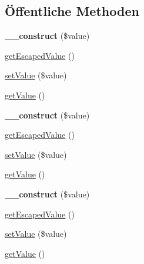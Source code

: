 \subsection*{Öffentliche Methoden}
\begin{DoxyCompactItemize}
\item 
\mbox{\label{class_eluceo_1_1i_cal_1_1_property_1_1_string_value_a1ab822389ddc6e91b84c4edf528134a0}} 
{\bfseries \+\_\+\+\_\+construct} (\$value)
\item 
\mbox{\hyperlink{class_eluceo_1_1i_cal_1_1_property_1_1_string_value_a76f74785d3f3bd3533c40090d2340c01}{get\+Escaped\+Value}} ()
\item 
\mbox{\hyperlink{class_eluceo_1_1i_cal_1_1_property_1_1_string_value_ae8d54aad71b757776262b478a4be042d}{set\+Value}} (\$value)
\item 
\mbox{\hyperlink{class_eluceo_1_1i_cal_1_1_property_1_1_string_value_a0d3ef7c09ebf33769947799a389b5871}{get\+Value}} ()
\item 
\mbox{\label{class_eluceo_1_1i_cal_1_1_property_1_1_string_value_a1ab822389ddc6e91b84c4edf528134a0}} 
{\bfseries \+\_\+\+\_\+construct} (\$value)
\item 
\mbox{\hyperlink{class_eluceo_1_1i_cal_1_1_property_1_1_string_value_a76f74785d3f3bd3533c40090d2340c01}{get\+Escaped\+Value}} ()
\item 
\mbox{\hyperlink{class_eluceo_1_1i_cal_1_1_property_1_1_string_value_ae8d54aad71b757776262b478a4be042d}{set\+Value}} (\$value)
\item 
\mbox{\hyperlink{class_eluceo_1_1i_cal_1_1_property_1_1_string_value_a0d3ef7c09ebf33769947799a389b5871}{get\+Value}} ()
\item 
\mbox{\label{class_eluceo_1_1i_cal_1_1_property_1_1_string_value_a1ab822389ddc6e91b84c4edf528134a0}} 
{\bfseries \+\_\+\+\_\+construct} (\$value)
\item 
\mbox{\hyperlink{class_eluceo_1_1i_cal_1_1_property_1_1_string_value_a76f74785d3f3bd3533c40090d2340c01}{get\+Escaped\+Value}} ()
\item 
\mbox{\hyperlink{class_eluceo_1_1i_cal_1_1_property_1_1_string_value_ae8d54aad71b757776262b478a4be042d}{set\+Value}} (\$value)
\item 
\mbox{\hyperlink{class_eluceo_1_1i_cal_1_1_property_1_1_string_value_a0d3ef7c09ebf33769947799a389b5871}{get\+Value}} ()
\end{DoxyCompactItemize}
